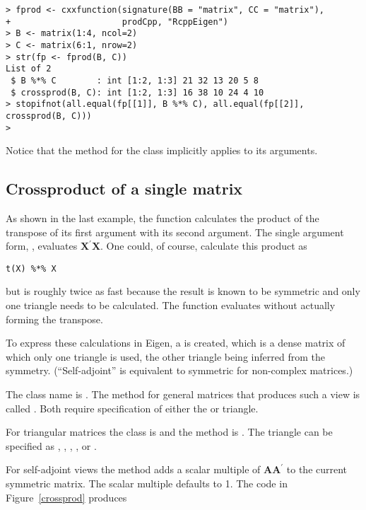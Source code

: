 \documentclass[shortnames,article]{jss}
\begin{document}
\begin{verbatim}
> fprod <- cxxfunction(signature(BB = "matrix", CC = "matrix"), 
+                      prodCpp, "RcppEigen")
> B <- matrix(1:4, ncol=2)
> C <- matrix(6:1, nrow=2)
> str(fp <- fprod(B, C))
List of 2
 $ B %*% C        : int [1:2, 1:3] 21 32 13 20 5 8
 $ crossprod(B, C): int [1:2, 1:3] 16 38 10 24 4 10
> stopifnot(all.equal(fp[[1]], B %*% C), all.equal(fp[[2]], crossprod(B, C)))
> 
\end{verbatim}

Notice that the  method for the  class
 implicitly applies  to its arguments.



\subsection{Crossproduct of a single matrix}
\label{sec:crossproduct}

As shown in the last example, the  function
 calculates the product of the transpose of its first
argument with its second argument.  The single argument form,
, evaluates $\bm X^\prime\bm X$.  One could, of
course, calculate this product as
\begin{verbatim}
t(X) %*% X
\end{verbatim}
but  is roughly twice as fast because the result is
known to be symmetric and only one triangle needs to be calculated.
The function  evaluates 
without actually forming the transpose.

To express these calculations in Eigen, a  is created,
which is a dense matrix of which only one triangle is used, the other
triangle being inferred from the symmetry.  (``Self-adjoint'' is
equivalent to symmetric for non-complex matrices.)

The  class name is .  The method for
general matrices that produces such a view is called
.  Both require specification of either the
 or  triangle.

For triangular matrices the class is  and the
method is .  The triangle can be specified as
, , , ,
 or .

For self-adjoint views the  method adds a scalar multiple
of $\bm A\bm A^\prime$ to the current symmetric matrix.  The scalar
multiple defaults to 1.  The code in Figure~\ref{crossprod} produces
\end{document}
